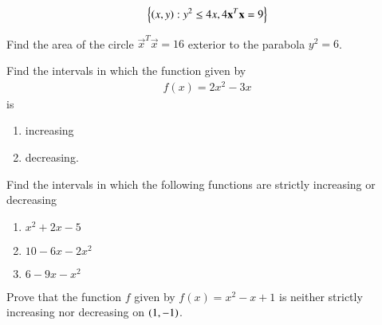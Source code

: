\begin{align}
\left\{\left(x,y\right) : y^2 \le 4x, 4\mathbf{x}^T\mathbf{x} = 9\right\}
\end{align}
%
\item Find the area of the circle $\vec{x}^T\vec{x} = 16$ exterior to the parabola $y^2 = 6$.
%
\item Find the intervals in which the function given by 
\begin{align}
f(x)  = 2x^2-3x
\end{align}
%
is 
\begin{enumerate}
\item increasing
\item decreasing.
\end{enumerate}
%
\item Find the intervals in which the following functions are strictly increasing or decreasing
%
\begin{enumerate}
\item $x^2+2x-5$
\item $10-6x-2x^2$
\item $6-9x-x^2$
\end{enumerate}
%
\item Prove that the function $f$ given by $f(x) = x^2-x+1$ is neither strictly increasing nor decreasing on $\left(1,-1\right)$.

